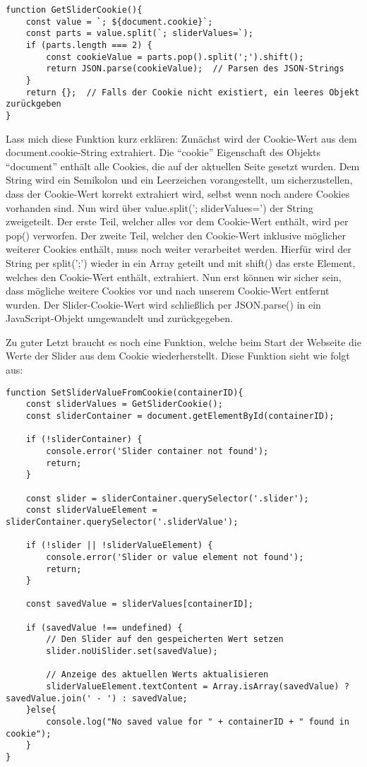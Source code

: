 \begin{lstlisting}[style=JavaScript]
function GetSliderCookie(){
    const value = `; ${document.cookie}`;
    const parts = value.split(`; sliderValues=`);
    if (parts.length === 2) {
        const cookieValue = parts.pop().split(';').shift();
        return JSON.parse(cookieValue);  // Parsen des JSON-Strings
    }
    return {};  // Falls der Cookie nicht existiert, ein leeres Objekt zurückgeben
}
\end{lstlisting}

Lass mich diese Funktion kurz erklären: Zunächst wird der Cookie-Wert aus dem document.cookie-String extrahiert. Die \enquote{cookie} Eigenschaft des Objekts \enquote{document} enthält alle Cookies, die auf der aktuellen Seite gesetzt wurden. Dem String wird ein Semikolon und ein Leerzeichen vorangestellt, um sicherzustellen, dass der Cookie-Wert korrekt extrahiert wird, selbst wenn noch andere Cookies vorhanden sind. Nun wird über value.split('; sliderValues=') der String zweigeteilt. Der erste Teil, welcher alles vor dem Cookie-Wert enthält, wird per pop() verworfen. Der zweite Teil, welcher den Cookie-Wert inklusive möglicher weiterer Cookies enthält, muss noch weiter verarbeitet werden. Hierfür wird der String per split(';') wieder in ein Array geteilt und mit shift() das erste Element, welches den Cookie-Wert enthält, extrahiert. Nun erst können wir sicher sein, dass mögliche weitere Cookies vor und nach unserem Cookie-Wert entfernt wurden. Der Slider-Cookie-Wert wird schließlich per JSON.parse() in ein JavaScript-Objekt umgewandelt und zurückgegeben.

Zu guter Letzt braucht es noch eine Funktion, welche beim Start der Webseite die Werte der Slider aus dem Cookie wiederherstellt. Diese Funktion sieht wie folgt aus:

\begin{lstlisting}[style=JavaScript]
function SetSliderValueFromCookie(containerID){
    const sliderValues = GetSliderCookie();
    const sliderContainer = document.getElementById(containerID);

    if (!sliderContainer) {
        console.error('Slider container not found');
        return;
    }

    const slider = sliderContainer.querySelector('.slider');
    const sliderValueElement = sliderContainer.querySelector('.sliderValue');

    if (!slider || !sliderValueElement) {
        console.error('Slider or value element not found');
        return;
    }

    const savedValue = sliderValues[containerID];

    if (savedValue !== undefined) {
        // Den Slider auf den gespeicherten Wert setzen
        slider.noUiSlider.set(savedValue);

        // Anzeige des aktuellen Werts aktualisieren
        sliderValueElement.textContent = Array.isArray(savedValue) ? savedValue.join(' - ') : savedValue;
    }else{
        console.log("No saved value for " + containerID + " found in cookie");
    }
}
\end{lstlisting}

